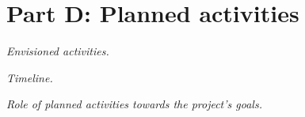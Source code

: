 \section{Part D: Planned activities}

\textit{Envisioned activities.}


\textit{Timeline.} 

\textit{Role of planned activities towards the project's goals.}



\clearpage


